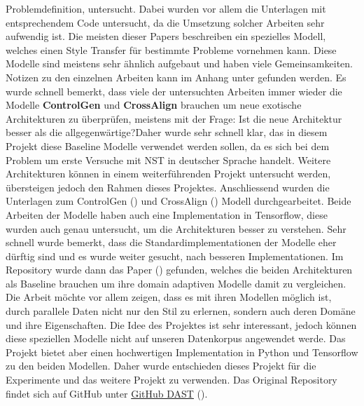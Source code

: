 Problemdefinition, untersucht. Dabei wurden vor allem die Unterlagen mit entsprechendem Code untersucht, da die
Umsetzung solcher Arbeiten sehr aufwendig ist. Die meisten dieser Papers beschreiben ein spezielles Modell, welches
einen Style Transfer für bestimmte Probleme vornehmen kann. Diese Modelle sind meistens sehr ähnlich aufgebaut und haben
viele Gemeinsamkeiten. Notizen zu den einzelnen Arbeiten kann im Anhang unter  gefunden werden.
\newline
\newline
Es wurde schnell bemerkt, dass viele der untersuchten Arbeiten immer wieder die Modelle \textbf{ControlGen} und
\textbf{CrossAlign} brauchen um neue exotische Architekturen zu überprüfen, meistens mit der Frage: \glqq Ist die neue
Architektur besser als die allgegenwärtige?\grqq Daher wurde sehr schnell klar, das in diesem Projekt diese Baseline
Modelle verwendet werden sollen, da es sich bei dem Problem um erste Versuche mit \gls{NST} in deutscher Sprache
handelt. Weitere Architekturen können in einem weiterführenden Projekt untersucht werden, übersteigen jedoch den Rahmen
dieses Projektes.
\newline
\newline
Anschliessend wurden die Unterlagen zum ControlGen (\cite{hu2017controlled}) und CrossAlign (\cite{shen2017style})
Modell durchgearbeitet. Beide Arbeiten der Modelle haben auch eine Implementation in Tensorflow, diese wurden auch genau
untersucht, um die Architekturen besser zu verstehen. Sehr schnell wurde bemerkt, dass die Standardimplementationen der
Modelle eher dürftig sind und es wurde weiter gesucht, nach besseren Implementationen.
\newline
Im Repository wurde dann das Paper (\cite{Li2019DomainAT}) gefunden, welches die beiden Architekturen als Baseline
brauchen um ihre domain adaptiven Modelle damit zu vergleichen. Die Arbeit möchte vor allem zeigen, dass es mit ihren
Modellen möglich ist, durch parallele Daten nicht nur den Stil zu erlernen, sondern auch deren Domäne und ihre
Eigenschaften. Die Idee des Projektes ist sehr interessant, jedoch können diese speziellen Modelle nicht auf unseren
Datenkorpus angewendet werde. Das Projekt bietet aber einen hochwertigen Implementation in Python und Tensorflow zu den
beiden Modellen. Daher wurde entschieden dieses Projekt für die Experimente und das weitere Projekt zu verwenden. Das
Original Repository findet sich auf GitHub unter \hyperlink{https://github.com/cookielee77/DAST}{GitHub DAST}
(\cite{cookielee77_dast}).

